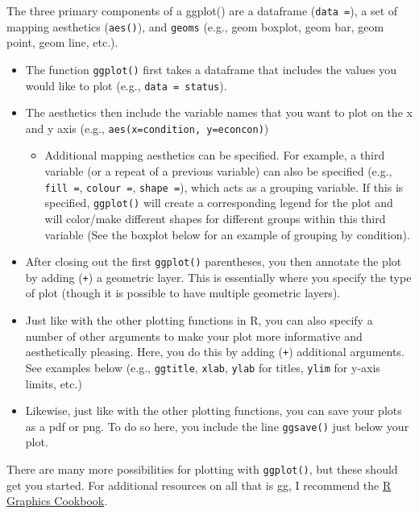 \documentclass[
  letterpaper,
  DIV=11,
  numbers=noendperiod]{scrreprt}
\providecommand{\tightlist}{%
  \setlength{\itemsep}{0pt}\setlength{\parskip}{0pt}}\usepackage{longtable,booktabs,array}
\begin{document}
The three primary components of a ggplot() are a dataframe
(\texttt{data\ =}), a set of mapping aesthetics (\texttt{aes()}), and
\texttt{geoms} (e.g., geom boxplot, geom bar, geom point, geom line,
etc.).

\begin{itemize}
\tightlist
\item
  The function \texttt{ggplot()} first takes a dataframe that includes
  the values you would like to plot (e.g., \texttt{data\ =\ status}).
\item
  The aesthetics then include the variable names that you want to plot
  on the x and y axis (e.g., \texttt{aes(x=condition,\ y=econcon)})

  \begin{itemize}
  \tightlist
  \item
    Additional mapping aesthetics can be specified. For example, a third
    variable (or a repeat of a previous variable) can also be specified
    (e.g., \texttt{fill\ =}, \texttt{colour\ =}, \texttt{shape\ =}),
    which acts as a grouping variable. If this is specified,
    \texttt{ggplot()} will create a corresponding legend for the plot
    and will color/make different shapes for different groups within
    this third variable (See the boxplot below for an example of
    grouping by condition).
  \end{itemize}
\item
  After closing out the first \texttt{ggplot()} parentheses, you then
  annotate the plot by adding (\texttt{+}) a geometric layer. This is
  essentially where you specify the type of plot (though it is possible
  to have multiple geometric layers).
\item
  Just like with the other plotting functions in R, you can also specify
  a number of other arguments to make your plot more informative and
  aesthetically pleasing. Here, you do this by adding (\texttt{+})
  additional arguments. See examples below (e.g., \texttt{ggtitle},
  \texttt{xlab}, \texttt{ylab} for titles, \texttt{ylim} for y-axis
  limits, etc.)
\item
  Likewise, just like with the other plotting functions, you can save
  your plots as a pdf or png. To do so here, you include the line
  \texttt{ggsave()} just below your plot.
\end{itemize}

There are many more possibilities for plotting with \texttt{ggplot()},
but these should get you started. For additional resources on all that
is gg, I recommend the \href{https://\%20r-graphics.org/}{R Graphics
Cookbook}.
\end{document}
